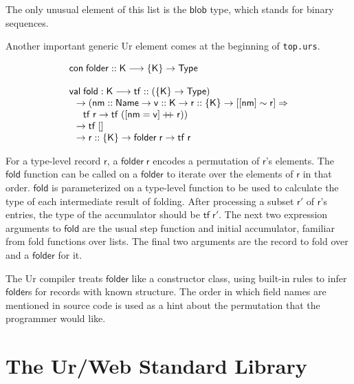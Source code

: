 \documentclass{article}
\newcommand{\mt}[1]{\mathsf{#1}}
\newcommand{\rc}{+ \hspace{-.075in} + \;}
\begin{document}
The only unusual element of this list is the $\mt{blob}$ type, which stands for binary sequences.

Another important generic Ur element comes at the beginning of \texttt{top.urs}.

$$\begin{array}{l}
  \mt{con} \; \mt{folder} :: \mt{K} \longrightarrow \{\mt{K}\} \to \mt{Type} \\
  \\
  \mt{val} \; \mt{fold} : \mt{K} \longrightarrow \mt{tf} :: (\{\mt{K}\} \to \mt{Type}) \\
  \hspace{.1in} \to (\mt{nm} :: \mt{Name} \to \mt{v} :: \mt{K} \to \mt{r} :: \{\mt{K}\} \to [[\mt{nm}] \sim \mt{r}] \Rightarrow \\
  \hspace{.2in} \mt{tf} \; \mt{r} \to \mt{tf} \; ([\mt{nm} = \mt{v}] \rc \mt{r})) \\
  \hspace{.1in} \to \mt{tf} \; [] \\
  \hspace{.1in} \to \mt{r} :: \{\mt{K}\} \to \mt{folder} \; \mt{r} \to \mt{tf} \; \mt{r}
\end{array}$$

For a type-level record $\mt{r}$, a $\mt{folder} \; \mt{r}$ encodes a permutation of $\mt{r}$'s elements.  The $\mt{fold}$ function can be called on a $\mt{folder}$ to iterate over the elements of $\mt{r}$ in that order.  $\mt{fold}$ is parameterized on a type-level function to be used to calculate the type of each intermediate result of folding.  After processing a subset $\mt{r'}$ of $\mt{r}$'s entries, the type of the accumulator should be $\mt{tf} \; \mt{r'}$.  The next two expression arguments to $\mt{fold}$ are the usual step function and initial accumulator, familiar from fold functions over lists.  The final two arguments are the record to fold over and a $\mt{folder}$ for it.

The Ur compiler treats $\mt{folder}$ like a constructor class, using built-in rules to infer $\mt{folder}$s for records with known structure.  The order in which field names are mentioned in source code is used as a hint about the permutation that the programmer would like.


\section{The Ur/Web Standard Library}
\end{document}
